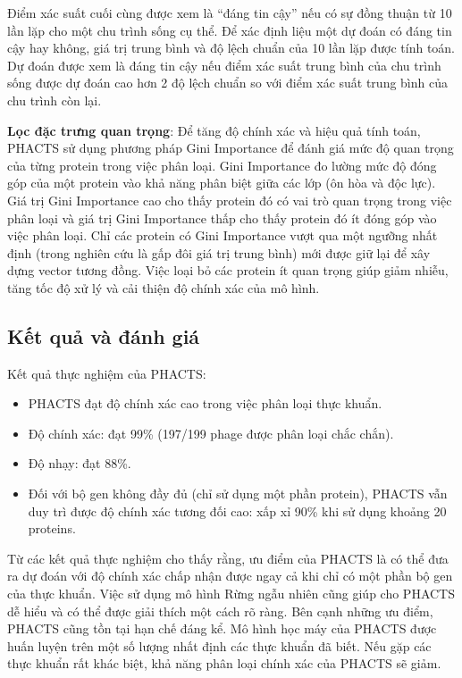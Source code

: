 Điểm xác suất cuối cùng được xem là “đáng tin cậy” nếu có sự đồng thuận từ 10 lần lặp cho một chu trình sống cụ thể. Để xác định liệu một dự đoán có đáng tin cậy hay không, giá trị trung bình và độ lệch chuẩn của 10 lần lặp được tính toán. Dự đoán được xem là đáng tin cậy nếu điểm xác suất trung bình của chu trình sống được dự đoán cao hơn 2 độ lệch chuẩn so với điểm xác suất trung bình của chu trình còn lại.

\textbf{Lọc đặc trưng quan trọng}: Để tăng độ chính xác và hiệu quả tính toán, PHACTS sử dụng phương pháp Gini Importance để đánh giá mức độ quan trọng của từng protein trong việc phân loại. Gini Importance đo lường mức độ đóng góp của một protein vào khả năng phân biệt giữa các lớp (ôn hòa và độc lực). Giá trị Gini Importance cao cho thấy protein đó có vai trò quan trọng trong việc phân loại và giá trị Gini Importance thấp cho thấy protein đó ít đóng góp vào việc phân loại. Chỉ các protein có Gini Importance vượt qua một ngưỡng nhất định (trong nghiên cứu là gấp đôi giá trị trung bình) mới được giữ lại để xây dựng vector tương đồng. Việc loại bỏ các protein ít quan trọng giúp giảm nhiễu, tăng tốc độ xử lý và cải thiện độ chính xác của mô hình.

\subsection{Kết quả và đánh giá}
Kết quả thực nghiệm của PHACTS:
    \begin{itemize}
        \item PHACTS đạt độ chính xác cao trong việc phân loại thực khuẩn.
        \item Độ chính xác: đạt 99\% (197/199 phage được phân loại chắc chắn). 
        \item Độ nhạy: đạt 88\%. 
        \item Đối với bộ gen không đầy đủ (chỉ sử dụng một phần protein), PHACTS vẫn duy trì được độ chính xác tương đối cao: xấp xỉ 90\% khi sử dụng khoảng 20 proteins.
    \end{itemize}

Từ các kết quả thực nghiệm cho thấy rằng, ưu điểm của PHACTS là có thể đưa ra dự đoán với độ chính xác chấp nhận được ngay cả khi chỉ có một phần bộ gen của thực khuẩn. Việc sử dụng mô hình Rừng ngẫu nhiên cũng giúp cho PHACTS dễ hiểu và có thể được giải thích một cách rõ ràng. Bên cạnh những ưu điểm, PHACTS cũng tồn tại hạn chế đáng kể. Mô hình học máy của PHACTS được huấn luyện trên một số lượng nhất định các thực khuẩn đã biết. Nếu gặp các thực khuẩn rất khác biệt, khả năng phân loại chính xác của PHACTS sẽ giảm.

